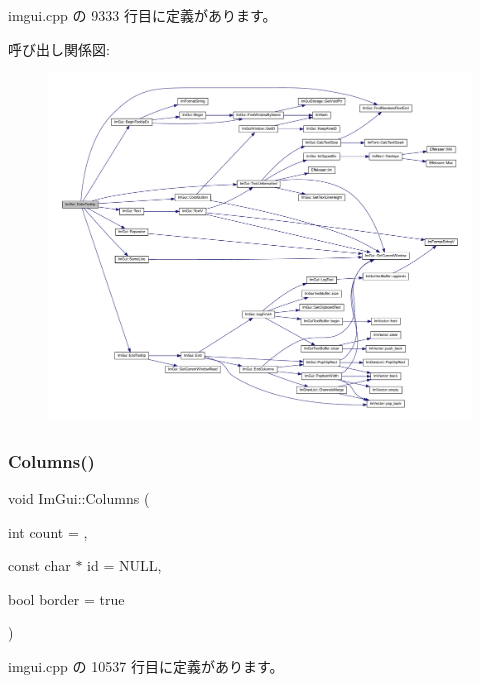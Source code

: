  imgui.\+cpp の 9333 行目に定義があります。

呼び出し関係図\+:\nopagebreak
\begin{figure}[H]
\begin{center}
\leavevmode
\includegraphics[width=350pt]{namespace_im_gui_afad90b366b6471e3b13175c0ebeb26c8_cgraph}
\end{center}
\end{figure}
\mbox{\label{namespace_im_gui_a0e2889956542527c4039b6b8bf5c2a38}} 
\subsubsection{\texorpdfstring{Columns()}{Columns()}}
{\footnotesize\ttfamily void Im\+Gui\+::\+Columns (\begin{DoxyParamCaption}\item[{int}]{count = {},  }\item[{const char $\ast$}]{id = {\ttfamily NULL},  }\item[{bool}]{border = {\ttfamily true} }\end{DoxyParamCaption})}



 imgui.\+cpp の 10537 行目に定義があります。

